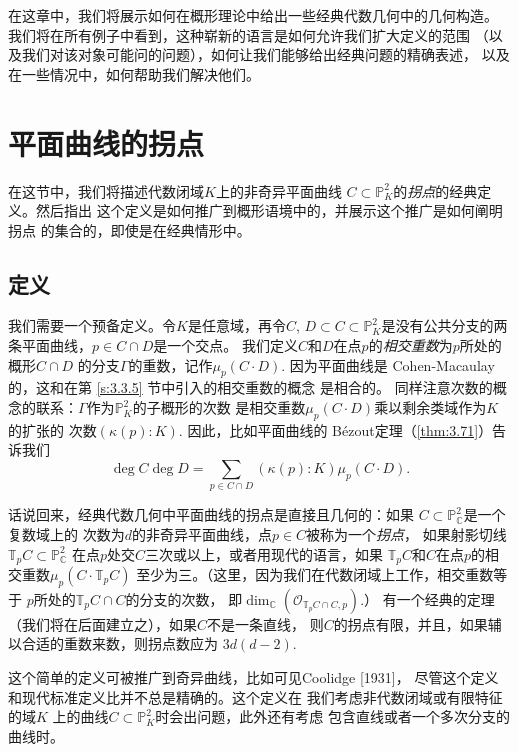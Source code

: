 在这章中，我们将展示如何在概形理论中给出一些经典代数几何中的几何构造。
我们将在所有例子中看到，这种崭新的语言是如何允许我们扩大定义的范围
（以及我们对该对象可能问的问题），如何让我们能够给出经典问题的精确表述，
以及在一些情况中，如何帮助我们解决他们。

\section{平面曲线的拐点}\label{s:4.1}

在这节中，我们将描述代数闭域$K$上的非奇异平面曲线
$C\subset \mathbb P_K^2$的\textit{拐点}的经典定义。然后指出
这个定义是如何推广到概形语境中的，并展示这个推广是如何阐明拐点
的集合的，即使是在经典情形中。

\subsection{定义}\label{s:4.1.1}

我们需要一个预备定义。令$K$是任意域，再令$C$, $D\subset C\subset \mathbb P_K^2$是没有公共分支的两条平面曲线，$p\in C\cap D$是一个交点。
我们定义$C$和$D$在点$p$的\textit{相交重数}为$p$所处的概形$C\cap D$
的分支$\Gamma$的重数，记作$\mu_p(C\cdot D)$. 因为平面曲线是
Cohen-Macaulay的，这和在第 \ref{s:3.3.5} 节中引入的相交重数的概念
是相合的。%
同样注意次数的概念的联系：$\Gamma$作为$\mathbb P_K^2$的子概形的次数
是相交重数$\mu_p(C\cdot D)$乘以剩余类域作为$K$的扩张的
次数$(\kappa(p):K)$. 因此，比如平面曲线的
B\'ezout定理（\ref{thm:3.71}）告诉我们
\[
	\deg C\deg D=\sum_{p\in C\cap D}
	(\kappa(p):K)\mu_p(C\cdot D).
\]

话说回来，经典代数几何中平面曲线的拐点是直接且几何的：如果
$C\subset \mathbb P_{\mathbb C}^2$是一个复数域上的
次数为$d$的非奇异平面曲线，点$p\in C$被称为一个\textit{拐点}，
如果射影切线$\mathbb T_pC\subset \mathbb P_{\mathbb C}^2$
在点$p$处交$C$三次或以上，或者用现代的语言，如果
$\mathbb T_pC$和$C$在点$p$的相交重数$\mu_p(C\cdot \mathbb T_pC)$
至少为三。（这里，因为我们在代数闭域上工作，相交重数等于
$p$所处的$\mathbb T_pC\cap C$的分支的次数，
即$\dim_{\mathbb C}(\mathscr O_{\mathbb T_pC\cap C,p})$.）
有一个经典的定理（我们将在后面建立之），如果$C$不是一条直线，
则$C$的拐点有限，并且，如果辅以合适的重数来数，则拐点数应为
$3d(d-2)$.

这个简单的定义可被推广到奇异曲线，比如可见Coolidge [1931]，
尽管这个定义和现代标准定义比并不总是精确的。这个定义在
我们考虑非代数闭域或有限特征的域$K$
上的曲线$C\subset \mathbb P_K^2$时会出问题，此外还有考虑
包含直线或者一个多次分支的曲线时。

